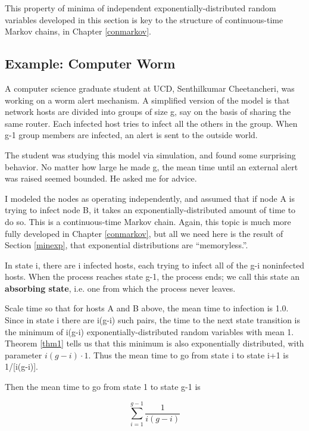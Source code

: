 This property of minima of independent exponentially-distributed random
variables developed in this section is key to the structure of
continuous-time Markov chains, in Chapter \ref{conmarkov}.

\subsection{Example:  Computer Worm}
\label{senthi}

A computer science graduate student at UCD, Senthilkumar Cheetancheri,
was working on a worm alert mechanism.  A simplified version of the
model is that network hosts are divided into groups of size g, say on
the basis of sharing the same router.  Each infected host tries to
infect all the others in the group.  When g-1 group members are
infected, an alert is sent to the outside world.

The student was studying this model via simulation, and found some
surprising behavior.  No matter how large he made g, the mean time until
an external alert was raised seemed bounded.  He asked me for advice.

I modeled the nodes as operating independently, and assumed that if node
A is trying to infect node B, it takes an exponentially-distributed
amount of time to do so.  This is a continuous-time Markov chain.
Again, this topic is much more fully developed in Chapter
\ref{conmarkov}, but all we need here is the result of Section
\ref{minexp}, that exponential distributions are ``memoryless.''. 

In state i, there are i infected hosts, each trying to infect all of the
g-i noninfected hosts.  When the process reaches state g-1, the process
ends; we call this state an {\bf absorbing state}, i.e. one from which
the process never leaves.

Scale time so that for hosts A and B above, the mean time to infection
is 1.0.  Since in state i there are i(g-i) such pairs, the time to the
next state transition is the minimum of i(g-i) exponentially-distributed
random variables with mean 1.  Theorem \ref{thm1} tells us that this
minimum is also exponentially distributed, with parameter $i(g-i) \cdot
1$.  Thus the mean time to go from state i to state i+1 is 1/[i(g-i)].


Then the mean time to go from state 1 to state g-1 is

\begin{equation}
\label{s1}
\sum_{i=1}^{g-1} \frac{1}{i(g-i)}
\end{equation}

